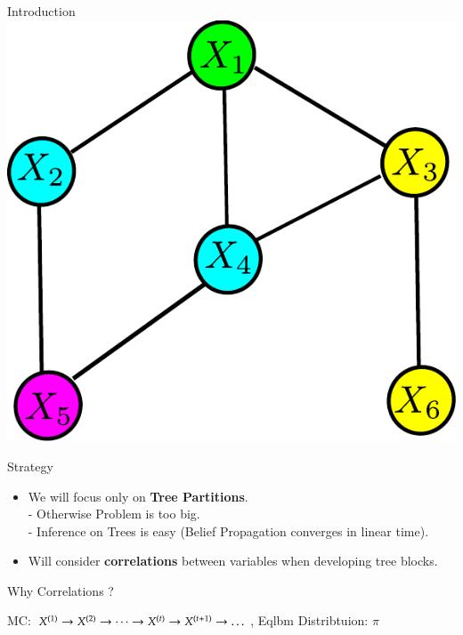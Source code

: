 \documentclass[serif,mathserif,final]{beamer}
\newcommand{\itemlinespace}{0.3in}
\newcommand{\insertlinespace}{\vspace{\itemlinespace}}
\newcommand{\semititle}[1]{\textcolor{red}{\Huge \textbf{#1}}}
\begin{document}
\begin{frame}{}
\begin{columns}[t]
\begin{column}{0.49\linewidth}
\begin{block}{\Huge Introduction}
{          \includegraphics[width=\localimgwidtha]{figs/bg3} 
          \insertlinespace
        }
      \end{block}

      \begin{block}{\Huge Strategy}
        { \huge
        \begin{itemize}
          \item We will focus only on \textbf{Tree Partitions}. \\
            \hspace{0.2in} - Otherwise Problem is too big. \\
            \hspace{0.2in} -  Inference on Trees is easy (Belief Propagation
                              converges in linear time).
          \item Will consider \textbf{correlations} between variables when
                developing tree blocks.
        \end{itemize}
        } 
      \end{block}

      \begin{block}{\Huge Why Correlations ?}
      { \huge
% 
        \insertlinespace
        MC: $X^{(1)} \rightarrow X^{(2)} \rightarrow \dots \rightarrow X^{(t)}
          \rightarrow X^{(t+1)} \rightarrow \dots $, \hspace{0.2in}
        Eqlbm Distribtuion: $\pi$
        \insertlinespace

}
\end{block}
\end{column}
\end{columns}
\end{frame}
\end{document}
